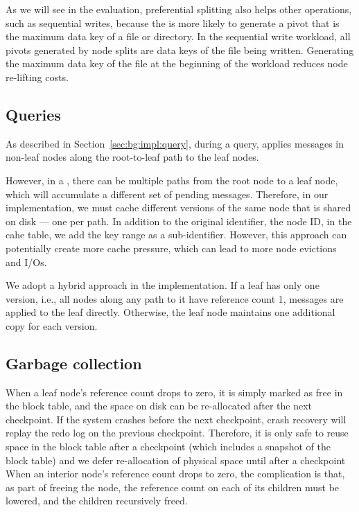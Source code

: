As we will see in the evaluation, preferential splitting also helps
other operations, such as sequential writes, because the \bet is more likely
to generate a pivot that is the maximum data key of a file or directory.
In the sequential write workload, all pivots generated by node splits are
data keys of the file being written.
Generating the maximum data key of the file at the beginning of the workload
reduces node re-lifting costs.

\subsection{Queries}

As described in Section~\ref{sec:bg:impl:query}, during a query,
\fti applies messages in non-leaf nodes along the root-to-leaf path to the
leaf nodes.

However, in a \bedag,
there can be multiple paths from the root node to a leaf node,
which will accumulate a different set of pending messages.
Therefore, in our implementation,
we must cache different versions of the same node that is shared on disk --- one per path.
In addition to the original identifier, the node ID, in the cahe table,
we add the key range as a sub-identifier.
However, this approach can potentially create more cache pressure,
which can lead to more node evictions and I/Os.

We adopt a hybrid approach in the implementation.
If a leaf has only one version, i.e., all nodes along any path to it have
reference count 1, messages are applied to the leaf directly.
Otherwise, the leaf node maintains one additional copy for each version.

\subsection{Garbage collection}

When a leaf node's reference count drops to zero,
it is simply marked as free in the block table,
and the space on disk can be re-allocated after the next checkpoint.
If the system crashes before the next checkpoint, crash recovery will replay the
redo log on the previous checkpoint.
Therefore, it is only safe to reuse space in the block table
after a checkpoint (which includes a snapshot of the block table)
and we defer re-allocation of physical space until after a checkpoint
When an interior node's reference count drops to zero, the complication
is that, as part of freeing the node, the reference count on each of its children
must be lowered, and the children recursively freed.

